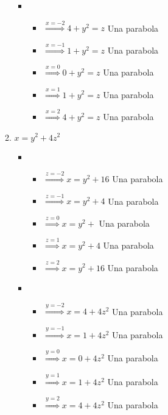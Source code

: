 \documentclass[../practica_02.tex]{subfiles}
\begin{document}
\begin{enumerate}
\begin{enumerate}
\begin{itemize}
                        \item
                            \begin{itemize}
                                \item $\stackrel{x=-2}{\Rightarrow} 4 + y^2 = z $ Una parabola
                                \item $\stackrel{x=-1}{\Rightarrow} 1 + y^2 = z $ Una parabola
                                \item $\stackrel{x=0}{\Rightarrow}  0 + y^2  = z $ Una parabola
                                \item $\stackrel{x=1}{\Rightarrow}  1 + y^2  = z $ Una parabola
                                \item $\stackrel{x=2}{\Rightarrow}  4 + y^2  = z $ Una parabola
                            \end{itemize}

                    \end{itemize}

                \item $x = y^2 + 4z^2$

                    \begin{itemize}
                        \item
                            \begin{itemize}
                                \item $\stackrel{z=-2}{\Rightarrow} x = y^2 + 16 $ Una parabola
                                \item $\stackrel{z=-1}{\Rightarrow} x = y^2 + 4 $ Una parabola
                                \item $\stackrel{z=0}{\Rightarrow} x = y^2 +  $ Una parabola
                                \item $\stackrel{z=1}{\Rightarrow} x = y^2 + 4 $ Una parabola
                                \item $\stackrel{z=2}{\Rightarrow} x = y^2 + 16 $ Una parabola
                            \end{itemize}

                        \item
                            \begin{itemize}
                                \item $\stackrel{y=-2}{\Rightarrow} x = 4 + 4z^2 $ Una parabola
                                \item $\stackrel{y=-1}{\Rightarrow} x = 1 + 4z^2 $ Una parabola
                                \item $\stackrel{y=0}{\Rightarrow} x = 0 + 4z^2 $ Una parabola
                                \item $\stackrel{y=1}{\Rightarrow} x = 1 + 4z^2 $ Una parabola
                                \item $\stackrel{y=2}{\Rightarrow} x = 4 + 4z^2 $ Una parabola
                            \end{itemize}


\end{itemize}
\end{enumerate}
\end{enumerate}
\end{document}
